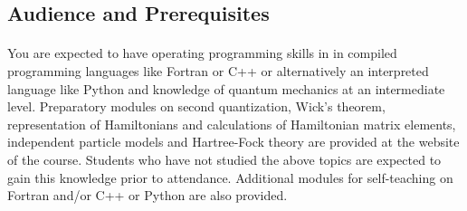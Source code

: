 \documentclass[%
oneside,                 %
final,                   %
10pt]{article}
\begin{document}
\noindent




\subsection*{Audience and Prerequisites}

\paragraph{}

You are expected to have operating programming skills in in
compiled programming languages like Fortran or C++ or alternatively an
interpreted language like Python and knowledge of quantum mechanics at
an intermediate level.  Preparatory modules on second quantization,
Wick's theorem, representation of Hamiltonians and calculations of
Hamiltonian matrix elements, independent particle models and
Hartree-Fock theory are provided at the website of the course.
Students who have not studied the above topics are expected to gain
this knowledge prior to attendance.  Additional modules for
self-teaching on Fortran and/or C++ or Python are also provided.












\end{document}
